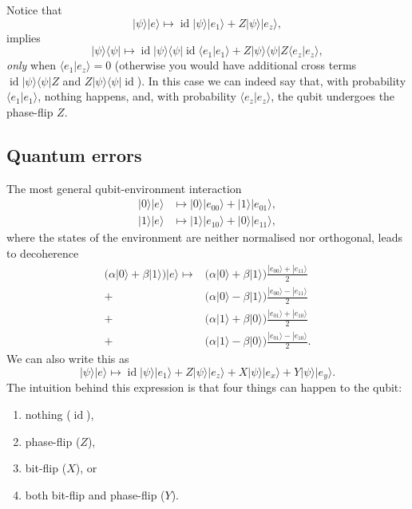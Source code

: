 \documentclass{article}
\providecommand{\tightlist}{%
  \setlength{\itemsep}{0pt}\setlength{\parskip}{0pt}}
\begin{document}
Notice that
\[
|\psi\rangle|e\rangle \longmapsto \operatorname{id}|\psi\rangle|e_1\rangle +Z|\psi\rangle|e_z\rangle,
\]
implies
\[
|\psi\rangle\langle\psi|\longmapsto \operatorname{id}|\psi\rangle\langle\psi| \operatorname{id}\langle e_1|e_1\rangle +Z|\psi\rangle\langle\psi| Z\langle e_z|e_z\rangle,
\]
\emph{only} when \(\langle e_1|e_z\rangle=0\) (otherwise you would have additional cross terms \(\operatorname{id}|\psi\rangle\langle\psi| Z\) and \(Z|\psi\rangle\langle\psi| \operatorname{id}\)).
In this case we can indeed say that, with probability \(\langle e_1|e_1\rangle\), nothing happens, and, with probability \(\langle e_z|e_z\rangle\), the qubit undergoes the phase-flip \(Z\).

\hypertarget{quantum-errors}{%
\subsection{Quantum errors}\label{quantum-errors}}

The most general qubit-environment interaction
\[
  \begin{aligned}
    |0\rangle|e\rangle &\longmapsto |0\rangle|e_{00}\rangle + |1\rangle|e_{01}\rangle,
  \\|1\rangle|e\rangle &\longmapsto |1\rangle|e_{10}\rangle + |0\rangle|e_{11}\rangle,
  \end{aligned}
\]
where the states of the environment are neither normalised nor orthogonal, leads to decoherence
\[
  \begin{aligned}
    \Big( \alpha|0\rangle + \beta|1\rangle \Big) |e\rangle \longmapsto
    & \Big( \alpha|0\rangle + \beta|1\rangle \Big) \frac{|e_{00}\rangle+|e_{11}\rangle}{2}
  \\+& \Big( \alpha|0\rangle - \beta|1\rangle \Big) \frac{|e_{00}\rangle-|e_{11}\rangle}{2}
  \\+& \Big( \alpha|1\rangle + \beta|0\rangle \Big) \frac{|e_{01}\rangle+|e_{10}\rangle}{2}
  \\+& \Big( \alpha|1\rangle - \beta|0\rangle \Big) \frac{|e_{01}\rangle-|e_{10}\rangle}{2}.
  \end{aligned}
\]
We can also write this as
\[
|\psi\rangle|e\rangle \longmapsto  \operatorname{id}|\psi\rangle|e_1\rangle + Z|\psi\rangle |e_z\rangle +X|\psi\rangle |e_x\rangle + Y|\psi\rangle |e_y\rangle.
\]
The intuition behind this expression is that four things can happen to the qubit:

\begin{enumerate}
\def\labelenumi{\arabic{enumi}.}
\tightlist
\item
  nothing (\(\operatorname{id}\)),
\item
  phase-flip (\(Z\)),
\item
  bit-flip (\(X\)), or
\item
  both bit-flip and phase-flip (\(Y\)).
\end{enumerate}
\end{document}
